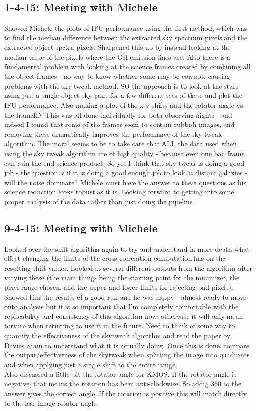 \documentclass{literature}
\begin{document}
\subsection{1-4-15: Meeting with Michele}
Showed Michele the plots of IFU performance using the first method, which was to find the median difference between the extracted sky spectrum pixels and the extracted object spetra pixels. Sharpened this up by instead looking at the median value of the pixels where the OH emission lines are. Also there is a fundamental problem with looking at the science frames created by combining all the object frames - no way to know whether some may be corrupt, causing problems with the sky tweak method. SO the approach is to look at the stars using just a single object-sky pair, for a few different sets of these and plot the IFU performance. Also making a plot of the x-y shifts and the rotator angle vs. the frameID. This was all done individually for both observing nights  - and indeed I found that some of the frames seem to contain rubbish images, and removing these dramatically improves the performance of the sky tweak algorithm. The moral seems to be to take care that ALL the data used when using the sky tweak algorithm are of high quality - because even one bad frame can ruin the end science product. So yes I think that sky tweak is doing a good job - the question is if it is doing a good enough job to look at distant galaxies - will the noise dominate? Michele must have the answer to these questions as his science reduction looks robust as it is. Looking forward to getting into some proper analysis of the data rather than just doing the pipeline. 

\subsection{9-4-15: Meeting with Michele}
Looked over the shift algorithm again to try and understand in more depth what effect changing the limits of the cross correlation computation has on the resulting shift values. Looked at several different outputs from the algorithm after varying these (the main things being the starting point for the minimizer, the pixel range chosen, and the upper and lower limits for rejecting bad pixels). Showed him the results of a good run and he was happy - almost ready to move onto analysis but it is so important that I'm completely comfortable with the replicability and consistency of this algorithm now, otherwise it will only mean torture when returning to use it in the future. Need to think of some way to quantify the effectiveness of the skytweak algorithm and read the paper by Davies again to understand what it is actually doing. Once this is done, compare the output/effectiveness of the skytweak when splitting the image into quadrants and when applying just a single shift to the entire iamge. \\ 
Also discussed a little bit the rotator angle for KMOS. If the rotator angle is negative, that means the rotation has been anti-clockwise. So addig 360 to the answer gives the correct angle. If the rotation is positive this will match directly to the lcal image rotator angle. 
\end{document}
